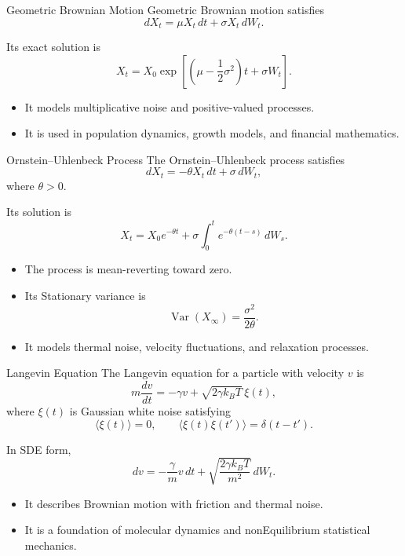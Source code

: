 \documentclass[a4paper, 10pt, onepage]{elegantbook}
\begin{document}
{\begin{frame}{Geometric Brownian Motion}
  Geometric Brownian motion satisfies
  \[
    dX_t
    =
    \mu X_t\,dt
    +
    \sigma X_t\,dW_t.
  \]

  Its exact solution is
  \[
    X_t
    =
    X_0
    \exp\left[
      \left(\mu-\frac{1}{2}\sigma^2\right)t
      +
      \sigma W_t
    \right].
  \]

  \begin{itemize}
    \item It models multiplicative noise and positive-valued processes.
    \item It is used in population dynamics, growth models, and financial mathematics.
  \end{itemize}
\end{frame}

\begin{frame}{Ornstein--Uhlenbeck Process}
  The Ornstein--Uhlenbeck process satisfies
  \[
    dX_t
    =
    -\theta X_t\,dt
    +
    \sigma\,dW_t,
  \]
  where \(\theta>0\).

  Its solution is
  \[
    X_t
    =
    X_0e^{-\theta t}
    +
    \sigma
    \int_0^t e^{-\theta(t-s)}\,dW_s.
  \]

  \begin{itemize}
    \item The process is mean-reverting toward zero.
    \item Its Stationary variance is
    \[
      \operatorname{Var}(X_\infty)
      =
      \frac{\sigma^2}{2\theta}.
    \]
    \item It models thermal noise, velocity fluctuations, and relaxation processes.
  \end{itemize}
\end{frame}

\begin{frame}{Langevin Equation}
  The Langevin equation for a particle with velocity \(v\) is
  \[
    m\frac{dv}{dt}
    =
    -\gamma v
    +
    \sqrt{2\gamma k_BT}\,\xi(t),
  \]
  where \(\xi(t)\) is Gaussian white noise satisfying
  \[
    \langle\xi(t)\rangle=0,
    \qquad
    \langle\xi(t)\xi(t')\rangle
    =
    \delta(t-t').
  \]

  In SDE form,
  \[
    dv
    =
    -\frac{\gamma}{m}v\,dt
    +
    \sqrt{\frac{2\gamma k_BT}{m^2}}\,dW_t.
  \]

  \begin{itemize}
    \item It describes Brownian motion with friction and thermal noise.
    \item It is a foundation of molecular dynamics and nonEquilibrium statistical mechanics.
  \end{itemize}
\end{frame}

}
\end{document}
